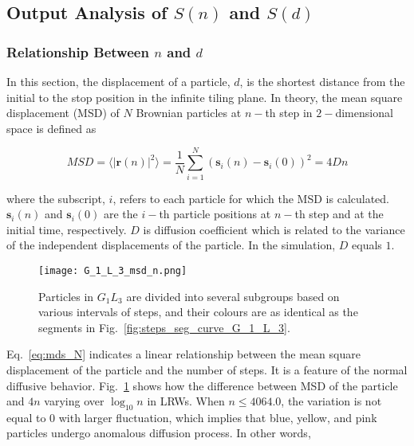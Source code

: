 \subsection{Output Analysis of $S(n)$ and $S(d)$}



\subsubsection{Relationship Between $n$ and $d$}


In this section, the displacement of a particle, $d$, is the shortest
distance from the initial to the stop position in the infinite tiling
plane. In theory, the mean square displacement (MSD) of $N$ Brownian
particles at $n-$th step in $2-$dimensional space is defined as

     \begin{equation}\label{eq:mds_N}
       MSD = \langle \lvert \bm{r}(n) \lvert^2 \rangle = \frac{1}{N} \sum^{N}_{i=1} (\bm{s}_{i}(n) - \bm{s}_{i}(0))^2 = 4Dn
     \end{equation}
     
where the subscript, $i$, refers to each particle for which the MSD is
calculated. $\bm{s}_{i}(n)$ and $\bm{s}_{i}(0)$ are the $i-$th
particle positions at $n-$th step and at the initial time,
respectively. $D$ is diffusion coefficient which is related to the
variance of the independent displacements of the particle. In the
simulation, $D$ equals $1$.
     
      
      \begin{figure}
         \centering
         \texttt{[image: G\_1\_L\_3\_msd\_n.png]}
         \caption{Particles in $G_1L_3$ are divided into several
           subgroups based on various intervals of steps, and their
           colours are as identical as the segments in
           Fig.~\ref{fig:steps_seg_curve_G_1_L_3}.}
         \label{fig:G_1_L_3_msd_n}
      \end{figure}


Eq.~\ref{eq:mds_N} indicates a linear relationship between the mean
square displacement of the particle and the number of steps. It is a
feature of the normal diffusive behavior. Fig.~\ref{fig:G_1_L_3_msd_n}
shows how the difference between MSD of the particle and $4n$ varying
over $\log_{10}n$ in LRWs. When $n \leq 4064.0$, the variation is not
equal to $0$ with larger fluctuation, which implies that blue, yellow,
and pink particles undergo anomalous diffusion process. In other
words,


